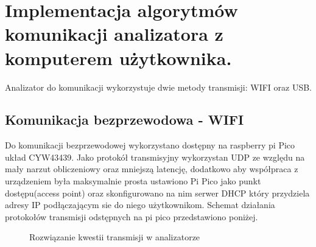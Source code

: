 \section{Implementacja algorytmów komunikacji analizatora z komputerem użytkownika.}
Analizator do komunikacji wykorzystuje dwie metody transmisji: WIFI oraz USB.   

\subsection{Komunikacja bezprzewodowa - WIFI}

\indent Do komunikacji bezprzewodowej wykorzystano dostępny na raspberry pi Pico
układ CYW43439. Jako protokół transmisyjny wykorzystan UDP ze względu na mały narzut
obliczeniowy oraz mniejszą latencję, dodatkowo aby współpraca z urządzeniem była maksymalnie prosta ustawiono Pi Pico
jako punkt dostępu(access point) oraz skonfigurowano na nim serwer DHCP który przydziela adresy
IP podłączającym sie do niego użytkownikom. Schemat działania protokołów transmisji
odstępnych na pi pico przedstawiono poniżej.


\begin{figure}[ht]
\centering
{}
\caption{Rozwiązanie kwestii transmisji w analizatorze}
\label{fig:udp-komunikacja}
\end{figure}



